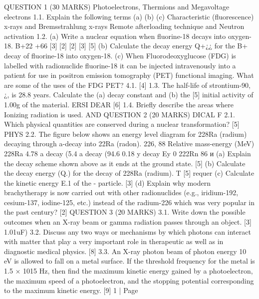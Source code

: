 \documentclass[addpoints]{exam}
\begin{document}
\begin{questions}
\begin{parts}
QUESTION 1 (30 MARKS)
Photoelectrons, Thermions and Megavoltage electrons
1.1.
Explain the following terms
(a)
(b)
(c)
Characteristic (fluorescence) x-rays and Bremsstrahlung x-rays Remote afterloading technique and Neutron activation
1.2. (a) Write a nuclear equation when fluorine-18 decays into oxygen-18.
B+22
+66
[3]
[2]
[2]
[3]
[5]
(b) Calculate the decay energy Q+¿¿ for the B+ decay of fluorine-18 into oxygen-18. (c) When Fluorodeoxyglucose (FDG) is labelled with radionuclide fluorine-18 it can be injected intravenously into a patient for use in positron emission tomography (PET) functional imaging. What are some of the uses of the FDG PET?
4.1.
[4]
1.3.
The half-life of strontium-90, ¿, is 28.8 years. Calculate the (a) decay constant and (b) the [5] initial activity of 1.00g of the material.
ERSI
DEAR
[6]
1.4.
Briefly describe the areas where Ionizing radiation is used.
AND
QUESTION 2 (20 MARKS)
DICAL F
2.1.
Which physical quantities are conserved during a nuclear transformation?
[5]
PHYS
2.2.
The figure below shows an energy level diagram for 228Ra (radium) decaying through a-decay into 22Ra (radon).
226, 88
Relative mass-energy (MeV)
228Ra
4.78
a decay (5.4%
a decay (94.6%
0.18
y decay Ey
0
222Rn
86
и
(a)
Explain the decay scheme shown above as it ends at the ground state.
[5]
(b)
Calculate the decay energy (Q.) for the
decay of 228Ra (radium).
T
[5]
requer
(c)
Calculate the kinetic energy E.1 of the
- particle.
[3]
(d)
Explain why modern brachytherapy is now carried out with other radionuclides (e.g., iridium-192, cesium-137, iodine-125, etc.) instead of the radium-226 which was very popular in the past century?
[2]
QUESTION 3 (20 MARKS)
3.1.
Write down the possible outcomes when an X-ray beam or gamma radiation passes through an object.
[3]
1.01uF)
3.2.
Discuss any two ways or mechanisms by which photons can interact with matter that play a very important role in therapeutic as well as in diagnostic medical physics.
[8]
3.3.
An X-ray photon beam of photon energy 10 eV is allowed to fall on a metal surface. If the threshold frequency for the metal is 1.5 × 1015 Hz, then find the maximum kinetic energy gained by a photoelectron, the maximum speed of a photoelectron, and the stopping potential corresponding to the maximum kinetic energy.
[9]
1 | Page
﻿


\end{parts}
\end{questions}
\end{document}

